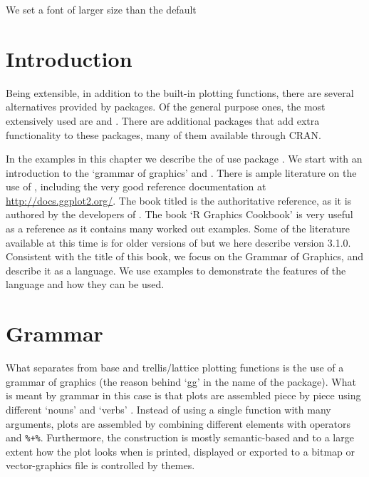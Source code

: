 \documentclass[krantz2]{krantz}\usepackage{knitr}%
\begin{document}
We set a font of larger size than the default

\begin{knitrout}\footnotesize
{}\color{fgcolor}\begin{kframe}
\begin{alltt}
\hlstd{(}\hlstd{(}\hlstd{))}
\end{alltt}
\end{kframe}
\end{knitrout}



\section{Introduction}

Being \Rlang extensible, in addition to the built-in plotting functions, there are several alternatives provided by packages. Of the general purpose ones, the most extensively used are  \autocite{Sarkar2008} and \ggplot \autocite{Wickham2016}. There are additional packages that add extra functionality to these packages, many of them available through CRAN.

In the examples in this chapter we describe the of use package \ggplot. We start with an introduction to the `grammar of graphics' and \ggplot. There is ample literature on the use of \ggplot, including the very good reference documentation at \url{http://docs.ggplot2.org/}. The book titled  \autocite{Wickham2016} is the authoritative reference, as it is authored by the developers of \ggplot. The book `R Graphics Cookbook' \autocite{Chang2018} is very useful as a reference as it contains many worked out examples. Some of the literature available at this time is for older versions of \ggplot but we here describe version 3.1.0. Consistent with the title of this book, we focus on the Grammar of Graphics, and describe it as a language. We use examples to demonstrate the features of the language and how they can be used.

\section{Grammar}
What separates \ggplot from base \Rlang and trellis/lattice plotting functions is the use of a grammar of graphics (the reason behind `gg' in the name of the package). What is meant by grammar in this case is that plots are assembled piece by piece using different `nouns' and `verbs' \autocite{Cleveland1985}. Instead of using a single function with many arguments, plots are assembled by combining different elements with operators \code{+} and \verb|%+%|. Furthermore, the construction is mostly semantic-based and to a large extent how the plot looks when is printed, displayed or exported to a bitmap or vector-graphics file is controlled by themes.
\end{document}
